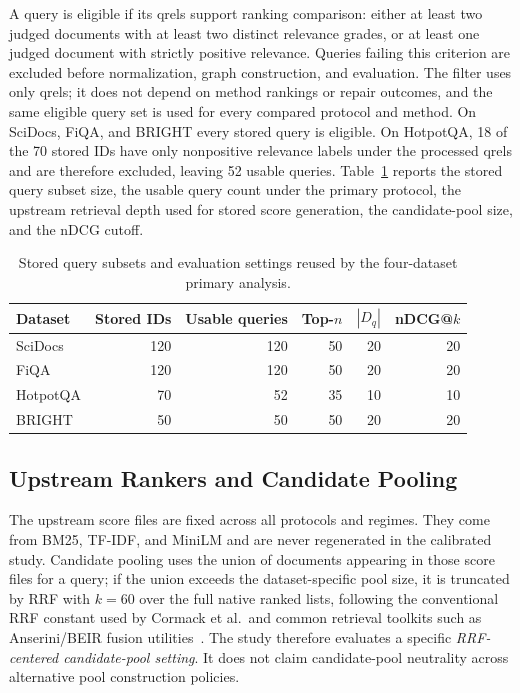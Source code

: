 \documentclass[manuscript,anonymous,review]{acmart}
\begin{document}
A query is eligible if its qrels support ranking comparison: either at least
two judged documents with at least two distinct relevance grades, or at least
one judged document with strictly positive relevance. Queries failing this
criterion are excluded before normalization, graph construction, and
evaluation. The filter uses only qrels; it does not depend on method rankings
or repair outcomes, and the same eligible query set is used for every compared
protocol and method. On SciDocs, FiQA, and BRIGHT every stored query is
eligible. On HotpotQA, 18 of the 70 stored IDs have only nonpositive relevance
labels under the processed qrels and are therefore excluded, leaving 52 usable
queries. Table~\ref{tab:dataset-stats} reports the stored query subset size,
the usable query count under the primary protocol, the upstream retrieval depth
used for stored score generation, the candidate-pool size, and the nDCG
cutoff.

\begin{table}[t]
  \caption{Stored query subsets and evaluation settings reused by the
    four-dataset primary analysis.}
  \label{tab:dataset-stats}
  \begin{tabular}{lrrrrr}
    \toprule
    Dataset & Stored IDs & Usable queries & Top-$n$ & $|D_q|$ & nDCG@$k$ \\
    \midrule
    SciDocs  & 120 & 120 & 50 & 20 & 20 \\
    FiQA     & 120 & 120 & 50 & 20 & 20 \\
    HotpotQA & 70  & 52  & 35 & 10 & 10 \\
    BRIGHT   & 50  & 50  & 50 & 20 & 20 \\
    \bottomrule
  \end{tabular}
\end{table}

\subsection{Upstream Rankers and Candidate Pooling}
\label{sec:rankers}

The upstream score files are fixed across all protocols and regimes. They come
from BM25, TF-IDF, and MiniLM and are never regenerated in the calibrated
study. Candidate pooling uses the union of documents appearing in those score
files for a query; if the union exceeds the dataset-specific pool size, it is
truncated by RRF with $k=60$ over the full native ranked lists, following the
conventional RRF constant used by Cormack et al.\ and common retrieval toolkits
such as Anserini/BEIR fusion utilities~\cite{cormack2009rrf}. The study
therefore evaluates a specific \emph{RRF-centered candidate-pool setting}. It
does not claim candidate-pool neutrality across alternative pool construction
policies.
\end{document}
